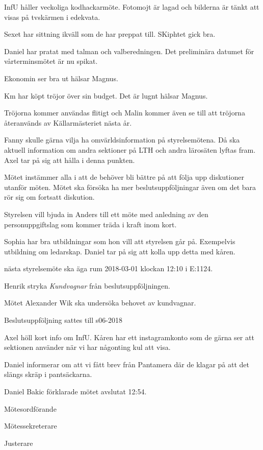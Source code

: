 \documentclass[10pt]{article}
\def\mo{Daniel Bakic}
\def\ms{Axel Voss}
\def\ji{Fanny Månefjord}
\begin{document}
\begin{paragrafer}
\begin{paragrafer}
InfU håller veckoliga kodhackarmöte. Fotomojt är lagad och bilderna är tänkt att visas på tvskärmen i edekvata.

Sexet har sittning ikväll som de har preppat till. SKiphtet gick bra.

Daniel har pratat med talman och valberedningen. Det preliminära datumet för vårterminsmötet är nu spikat.

  Ekonomin ser bra ut hälsar Magnus.


\end{paragrafer}

  Km har köpt tröjor över sin budget.
  Det är lugnt hälsar Magnus.

  Tröjorna kommer användas flitigt och Malin kommer även se till att tröjorna återanvänds av Källarmästeriet nästa år.

  Fanny skulle gärna vilja ha omvärldsinformation på styrelsemötena. Då ska aktuell information om andra sektioner på LTH och andra lärosäten lyftas fram. Axel tar på sig att hålla i denna punkten.

  Mötet instämmer alla i att de behöver bli bättre på att följa upp diskutioner utanför möten. Mötet ska försöka ha mer beslutsuppföljningar även om det bara rör sig om fortsatt diskution.

  Styrelsen vill bjuda in Anders till ett möte med anledning av den personuppgiftslag som kommer träda i kraft inom kort.

  Sophia har bra utbildningar som hon vill att styrelsen går på. Exempelvis utbildning om ledarskap. Daniel tar på sig att kolla upp detta med kåren.


\Mba nästa styrelsemöte ska äga rum 2018-03-01 klockan 12:10 i E:1124.


  Henrik \ypa stryka \emph{Kundvagnar} från beslutsuppföljningen.

  Mötet \ypa Alexander Wik ska undersöka behovet av kundvagnar.

\Mbabay

Beslutsuppföljning sattes till s06-2018




Axel höll kort info om InfU. Kåren har ett instagramkonto som de gärna ser att sektionen använder när vi har någonting kul att visa.

Daniel informerar om att vi fått brev från Pantamera där de klagar på att det slängs skräp i pantsäckarna.

{\mo} förklarade mötet avslutat 12:54.
\end{paragrafer}

\hidesignfoot
\begin{signatures}{3}
\signature{\mo}{Mötesordförande}
\signature{\ms}{Mötessekreterare}
\signature{\ji}{Justerare}
\end{signatures}
\end{document}
